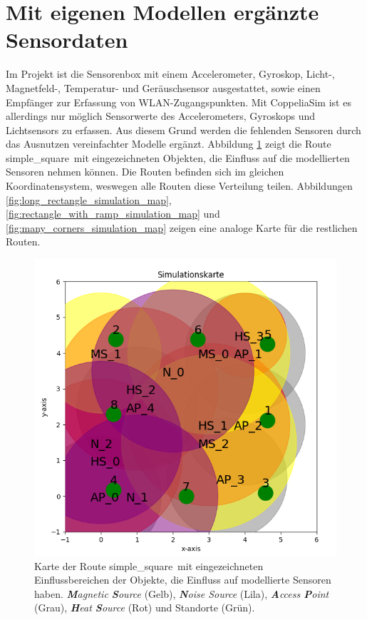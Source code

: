 \section{Mit eigenen Modellen ergänzte Sensordaten}
Im Projekt ist die Sensorenbox mit einem Accelerometer, Gyroskop, Licht-, Magnetfeld-,
Temperatur- und Geräuschsensor ausgestattet, sowie einen Empfänger zur Erfassung von WLAN-Zugangspunkten.
Mit CoppeliaSim ist es allerdings nur möglich Sensorwerte des Accelerometers, Gyroskops und Lichtsensors zu erfassen.
Aus diesem Grund werden die fehlenden Sensoren durch das Ausnutzen vereinfachter Modelle ergänzt.
\newline
\newline
Abbildung \ref{fig:simple_square_simulation_map} zeigt die Route \glqq simple\_square\grqq\ mit eingezeichneten Objekten,
die Einfluss auf die modellierten Sensoren nehmen können.
Die Routen befinden sich im gleichen Koordinatensystem, weswegen alle Routen diese Verteilung teilen.
Abbildungen \ref{fig:long_rectangle_simulation_map}, \ref{fig:rectangle_with_ramp_simulation_map} und \ref{fig:many_corners_simulation_map}
zeigen eine analoge Karte für die restlichen Routen.
\begin{figure}[h!]
    \centering
    \includegraphics[width=0.7\linewidth]{images/simple_square_simulation_map.png}
    \caption{Karte der Route \glqq simple\_square\grqq\ mit eingezeichneten Einflussbereichen der Objekte, die Einfluss auf modellierte Sensoren haben.
            \textit{\textbf{M}agnetic \textbf{S}ource} (Gelb), \textit{\textbf{N}oise Source} (Lila), \textit{\textbf{A}ccess \textbf{P}oint} (Grau),
            \textit{\textbf{H}eat \textbf{S}ource} (Rot) und Standorte (Grün).}
    \label{fig:simple_square_simulation_map}
\end{figure}

